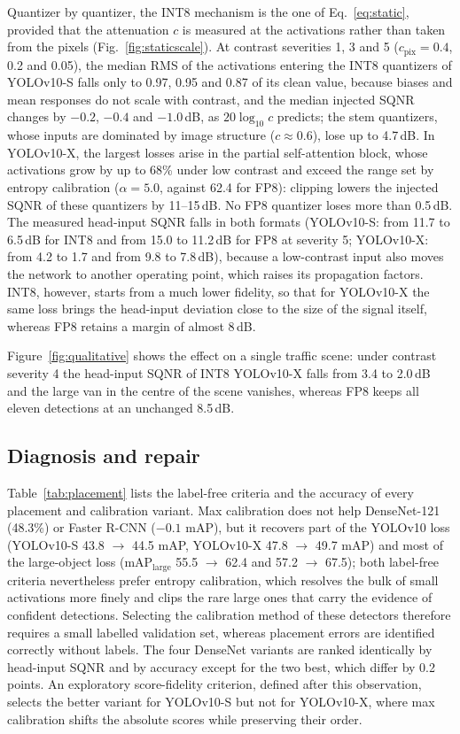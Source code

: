 \documentclass[pdflatex,sn-mathphys-num]{sn-jnl}%
\theoremstyle{thmstyleone}%
\theoremstyle{thmstyletwo}%
\theoremstyle{thmstylethree}%
\begin{document}
\begin{appendices}
Quantizer by quantizer, the INT8 mechanism is the one of Eq.~\eqref{eq:static}, provided that the attenuation $c$ is measured at the activations rather than taken from the pixels (Fig.~\ref{fig:staticscale}). At contrast severities 1, 3 and 5 ($c_\mathrm{pix}=0.4$, 0.2 and 0.05), the median RMS of the activations entering the INT8 quantizers of YOLOv10-S falls only to 0.97, 0.95 and 0.87 of its clean value, because biases and mean responses do not scale with contrast, and the median injected SQNR changes by $-0.2$, $-0.4$ and $-1.0$\,dB, as $20\log_{10}c$ predicts; the stem quantizers, whose inputs are dominated by image structure ($c\approx0.6$), lose up to 4.7\,dB. In YOLOv10-X, the largest losses arise in the partial self-attention block, whose activations grow by up to 68\% under low contrast and exceed the range set by entropy calibration ($\alpha=5.0$, against 62.4 for FP8): clipping lowers the injected SQNR of these quantizers by 11--15\,dB. No FP8 quantizer loses more than 0.5\,dB. The measured head-input SQNR falls in both formats (YOLOv10-S: from 11.7 to 6.5\,dB for INT8 and from 15.0 to 11.2\,dB for FP8 at severity 5; YOLOv10-X: from 4.2 to 1.7 and from 9.8 to 7.8\,dB), because a low-contrast input also moves the network to another operating point, which raises its propagation factors. INT8, however, starts from a much lower fidelity, so that for YOLOv10-X the same loss brings the head-input deviation close to the size of the signal itself, whereas FP8 retains a margin of almost 8\,dB.

Figure~\ref{fig:qualitative} shows the effect on a single traffic scene: under contrast severity 4 the head-input SQNR of INT8 YOLOv10-X falls from 3.4 to 2.0\,dB and the large van in the centre of the scene vanishes, whereas FP8 keeps all eleven detections at an unchanged 8.5\,dB.

\subsection{Diagnosis and repair}\label{sec:supp-res-repair}
Table~\ref{tab:placement} lists the label-free criteria and the accuracy of every placement and calibration variant. Max calibration does not help DenseNet-121 (48.3\%) or Faster R-CNN ($-0.1$ mAP), but it recovers part of the YOLOv10 loss (YOLOv10-S 43.8 $\rightarrow$ 44.5 mAP, YOLOv10-X 47.8 $\rightarrow$ 49.7 mAP) and most of the large-object loss (mAP$_\text{large}$ 55.5 $\rightarrow$ 62.4 and 57.2 $\rightarrow$ 67.5); both label-free criteria nevertheless prefer entropy calibration, which resolves the bulk of small activations more finely and clips the rare large ones that carry the evidence of confident detections. Selecting the calibration method of these detectors therefore requires a small labelled validation set, whereas placement errors are identified correctly without labels. The four DenseNet variants are ranked identically by head-input SQNR and by accuracy except for the two best, which differ by 0.2 points. An exploratory score-fidelity criterion, defined after this observation, selects the better variant for YOLOv10-S but not for YOLOv10-X, where max calibration shifts the absolute scores while preserving their order.


\end{appendices}
\end{document}
